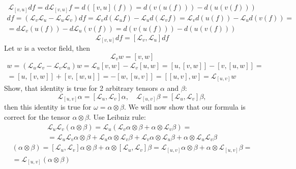 \documentclass[12pt]{article}
\theoremstyle{definition}
\begin{document}
\begin{enumerate}
\begin{itemize}
\begin{itemize}
        \begin{equation}
            \mathcal{L}_{[v,u]}df=d\mathcal{L}_{[v,u]}f=d([v,u](f))=d(v(u(f)))-d(u(v(f)))
        \end{equation}
        \begin{multline}
            [\mathcal{L}_v,\mathcal{L}_u]df=(\mathcal{L}_v\mathcal{L}_u-\mathcal{L}_u\mathcal{L}_v)df=\mathcal{L}_vd(\mathcal{L}_uf)-\mathcal{L}_ud(\mathcal{L}_vf)=\mathcal{L}_vd(u(f))-\mathcal{L}_ud(v(f))=\\=d\mathcal{L}_v(u(f))-d\mathcal{L}_u(v(f))=d(v(u(f)))-d(u(v(f)))
        \end{multline}
        \begin{equation}
            \mathcal{L}_{[v,u]}df=[\mathcal{L}_v,\mathcal{L}_u]df
        \end{equation}
        Let $w$ is a vector field, then
        \begin{equation}
            \mathcal{L}_vw=[v,w]
        \end{equation}
        \begin{multline}
            [\mathcal{L}_u,\mathcal{L}_v]w=(\mathcal{L}_u\mathcal{L}_v-\mathcal{L}_v\mathcal{L}_u)w=\mathcal{L}_u[v,w]-\mathcal{L}_v[u,w]=[u,[v,w]]-[v,[u,w]]=\\=[u,[v,w]]+[v,[w,u]]=-[w,[u,v]]=[[u,v],w]=\mathcal{L}_{[u,v]}w
        \end{multline}
        Show, that identity is true for 2 arbitrary tensors $\alpha$ and $\beta$:
        \begin{equation}
            \mathcal{L}_{[u,v]}\alpha =[\mathcal{L}_u,\mathcal{L}_v]\alpha,\quad \mathcal{L}_{[u,v]}\beta =[\mathcal{L}_u,\mathcal{L}_v]\beta,
        \end{equation}
        then this identity is true for $\omega=\alpha\otimes\beta$.
        We will now show that our formula is correct for the tensor $\alpha\otimes\beta$. Use Leibniz rule:
        \begin{multline}
            \mathcal{L}_u\mathcal{L}_v (\alpha \otimes \beta)=\mathcal{L}_u(\mathcal{L}_v \alpha \otimes \beta+\alpha \otimes \mathcal{L}_v \beta)=\\=\mathcal{L}_u\mathcal{L}_v \alpha \otimes \beta+\mathcal{L}_u\alpha\otimes \mathcal{L}_v\beta+\mathcal{L}_v\alpha\otimes \mathcal{L}_u\beta+\alpha\otimes\mathcal{L}_u\mathcal{L}_v\beta
        \end{multline}
        \begin{multline}
            [\mathcal{L}_u,\mathcal{L}_v](\alpha\otimes\beta)=[\mathcal{L}_u,\mathcal{L}_v]\alpha\otimes\beta+\alpha\otimes[\mathcal{L}_u,\mathcal{L}_v]\beta=\mathcal{L}_{[u,v]}\alpha\otimes\beta+\alpha\otimes\mathcal{L}_{[u,v]}\beta=\\=\mathcal{L}_{[u,v]}(\alpha\otimes\beta)

\end{multline}
\end{itemize}
\end{itemize}
\end{enumerate}
\end{document}
